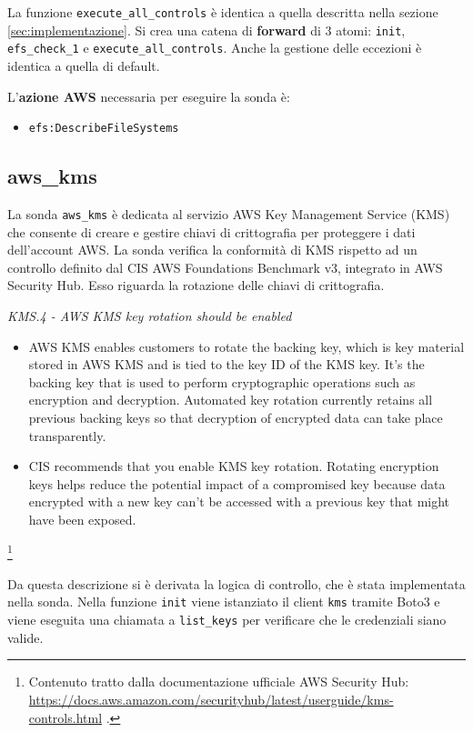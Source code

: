 La funzione \texttt{execute\_all\_controls} è identica a quella descritta nella sezione \ref{sec:implementazione}. Si crea una catena di \textbf{forward} di 3 atomi: \texttt{init}, \texttt{efs\_check\_1} e \texttt{execute\_all\_controls}. Anche la gestione delle eccezioni è identica a quella di default.

L'\textbf{azione AWS} necessaria per eseguire la sonda è:
\begin{itemize}
    \item \texttt{efs:DescribeFileSystems}
\end{itemize}

\subsection{aws\_kms}
\label{sec:kms}

La sonda \texttt{aws\_kms} è dedicata al servizio AWS Key Management Service (KMS) che consente di creare e gestire chiavi di crittografia per proteggere i dati dell'account AWS. La sonda verifica la conformità di KMS rispetto ad un controllo definito dal CIS AWS Foundations Benchmark v3, integrato in AWS Security Hub. Esso riguarda la rotazione delle chiavi di crittografia. 

\begin{mdframed}[backgroundcolor=gray!05, linecolor=gray!50]
\itshape
KMS.4 - AWS KMS key rotation should be enabled 
\begin{itemize}
    \item AWS KMS enables customers to rotate the backing key, which is key material stored in AWS KMS and is tied to the key ID of the KMS key. It's the backing key that is used to perform cryptographic operations such as encryption and decryption. Automated key rotation currently retains all previous backing keys so that decryption of encrypted data can take place transparently.
    \item CIS recommends that you enable KMS key rotation. Rotating encryption keys helps reduce the potential impact of a compromised key because data encrypted with a new key can't be accessed with a previous key that might have been exposed.
\end{itemize}
\end{mdframed}
\footnote{Contenuto tratto dalla documentazione ufficiale AWS Security Hub: \url{https://docs.aws.amazon.com/securityhub/latest/userguide/kms-controls.html} .}

Da questa descrizione si è derivata la logica di controllo, che è stata implementata nella sonda. Nella funzione \texttt{init} viene istanziato il client \texttt{kms} tramite Boto3 e viene eseguita una chiamata a \texttt{list\_keys} per verificare che le credenziali siano valide.

